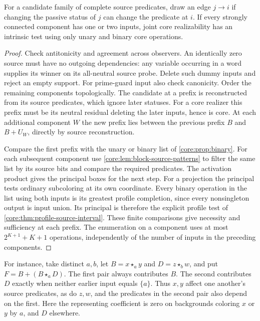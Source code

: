 \begin{corollary}
\label{core:cor:binary-source-components}
For a candidate family of complete source predicates, draw an edge
$j\to i$ if changing the passive status of $j$ can change the
predicate at $i$. If every strongly connected component has one or
two inputs, joint core realizability has an intrinsic test using
only unary and binary core operations.
\end{corollary}
\begin{proof}
Check antitonicity and agreement across observers. An identically zero
source must have no outgoing dependencies: any variable occurring in
a word supplies its winner on its all-neutral source probe. Delete
such dummy inputs and reject an empty support. For prime-guard input
also check canonicity. Order the remaining components topologically.
The candidate at a prefix is reconstructed from its source predicates,
which ignore later statuses. For a core realizer this prefix must be
its neutral residual deleting the later inputs, hence is core. At each
additional component $W$ the new prefix lies between the previous
prefix $B$ and $B+U_W$, directly by source reconstruction.

Compare the first prefix with the unary or binary list of
\cref{core:prop:binary}. For each subsequent component use
\cref{core:lem:block-source-patterns} to filter the same list by
its source bits and compare the required predicates. The activation
product gives the principal boxes for the next step.
For a projection the principal tests ordinary subcoloring at its
own coordinate. Every binary operation in the list using both
inputs is its greatest profile completion, since every nonsingleton
output is input union. Its principal is therefore the explicit
profile test of \cref{core:thm:profile-source-interval}.
These finite comparisons give necessity and sufficiency at each
prefix. The enumeration on a component uses at most
$2^{K+1}+K+1$ operations, independently of the number of inputs in
the preceding components.
\end{proof}

For instance, take distinct $a,b$, let $B=x\star_a y$ and
$D=z\star_b w$, and put $F=B+(B\star_a D)$. The first pair always
contributes $B$. The second contributes $D$ exactly when neither
earlier input equals $\{a\}$. Thus $x,y$ affect one another's source
predicates, as do $z,w$, and the predicates in the second pair also
depend on the first. Here the representing coefficient is zero on
backgrounds coloring $x$ or $y$ by $a$, and $D$ elsewhere.

